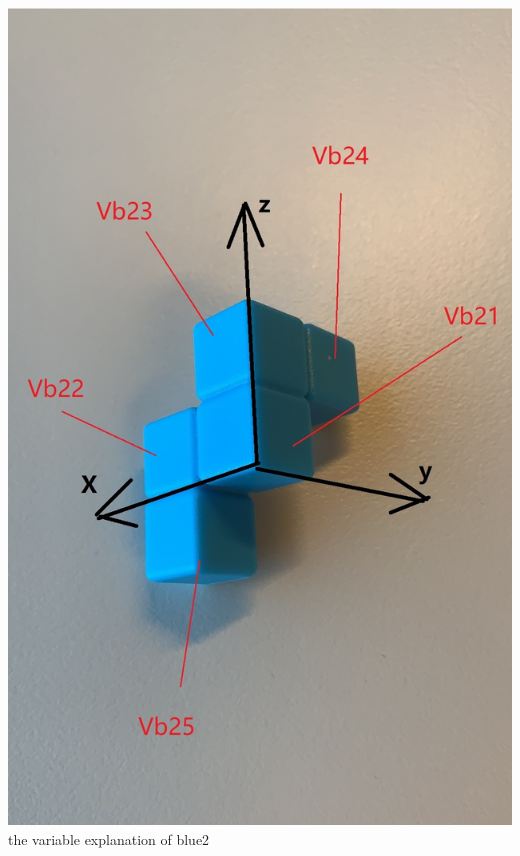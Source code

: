 \begin{center}
\includegraphics[scale=0.5]{game2blue2.jpg}\\
the variable explanation of blue2
\end{center}

